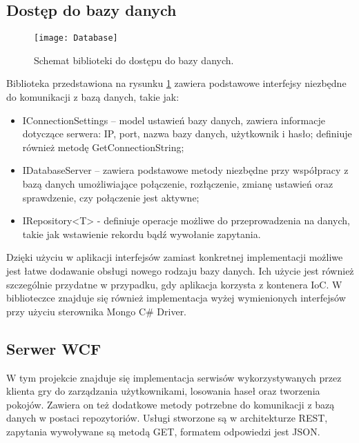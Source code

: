 \subsection{Dostęp do bazy danych}
 
\begin{figure}[htbp]
\centering
\texttt{[image: Database]}
\caption{Schemat biblioteki do dostępu do bazy danych.}
\label{fig:database}
\end{figure}
 
Biblioteka przedstawiona na rysunku \ref{fig:database} zawiera podstawowe interfejsy niezbędne do komunikacji z bazą danych, takie jak:
\begin{itemize}
\item IConnectionSettings – model ustawień bazy danych, zawiera informacje dotyczące serwera: IP, port, nazwa bazy danych, użytkownik i hasło; definiuje również metodę GetConnectionString;
\item IDatabaseServer – zawiera podstawowe metody niezbędne przy współpracy z bazą danych umożliwiające połączenie, rozłączenie, zmianę ustawień oraz sprawdzenie, czy połączenie jest aktywne;
\item IRepository<T> - definiuje operacje możliwe do przeprowadzenia na danych, takie jak wstawienie rekordu bądź wywołanie zapytania.
\end{itemize}

Dzięki użyciu w aplikacji interfejsów zamiast konkretnej implementacji możliwe jest łatwe dodawanie obsługi nowego rodzaju bazy danych. Ich użycie jest również szczególnie przydatne w przypadku, gdy aplikacja korzysta z kontenera IoC. W biblioteczce znajduje się również implementacja wyżej wymienionych interfejsów przy użyciu sterownika Mongo C{\#} Driver.

\subsection{Serwer WCF}
W tym projekcie znajduje się implementacja serwisów wykorzystywanych przez klienta gry do zarządzania użytkownikami, losowania haseł oraz tworzenia pokojów. Zawiera on też dodatkowe metody potrzebne do komunikacji z bazą danych w postaci repozytoriów. Usługi stworzone są w architekturze REST, zapytania wywoływane są metodą GET, formatem odpowiedzi jest JSON.

